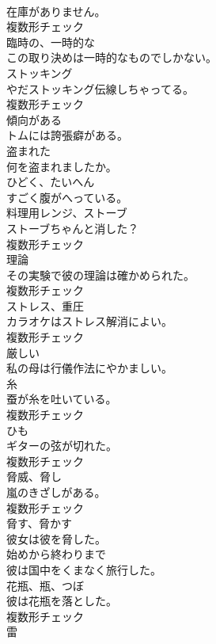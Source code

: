 \documentclass[8pt]{extreport}
\begin{document}
\begin{CJK}{UTF8}{min}
\\	在庫がありません。	
\\	複数形チェック
\\	[形容詞]	臨時の、一時的な	
\\	この取り決めは一時的なものでしかない。	
\\	[名詞]	ストッキング	
\\	やだストッキング伝線しちゃってる。	
\\	複数形チェック
\\	[動詞]	傾向がある	
\\	トムには誇張癖がある。	
\\	[形容詞]	盗まれた	
\\	何を盗まれましたか。	
\\	[副詞]	ひどく、たいへん	
\\	すごく腹がへっている。	
\\	[名詞]	料理用レンジ、ストーブ	
\\	ストーブちゃんと消した？	
\\	複数形チェック
\\	[名詞]	理論	
\\	その実験で彼の理論は確かめられた。	
\\	複数形チェック
\\	[名詞]	ストレス、重圧	
\\	カラオケはストレス解消によい。	
\\	複数形チェック
\\	[形容詞]	厳しい	
\\	私の母は行儀作法にやかましい。	
\\	[名詞]	糸	
\\	蚕が糸を吐いている。	
\\	複数形チェック
\\	[名詞]	ひも	
\\	ギターの弦が切れた。	
\\	複数形チェック
\\	[名詞]	脅威、脅し	
\\	嵐のきざしがある。	
\\	複数形チェック
\\	[動詞]	脅す、脅かす	
\\	彼女は彼を脅した。	
\\	[副詞]	始めから終わりまで	
\\	彼は国中をくまなく旅行した。	
\\	[名詞]	花瓶、瓶、つぼ	
\\	彼は花瓶を落とした。	
\\	複数形チェック
\\	[名詞]	雷	

\end{CJK}
\end{document}
